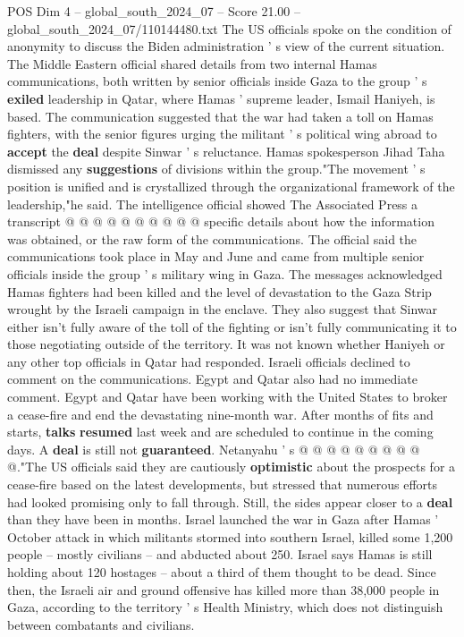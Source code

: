 \begin{textsample}{POS Dim 4 – global\_south\_2024\_07 – Score 21.00 – global\_south\_2024\_07/110144480.txt}
The US officials spoke on the condition of anonymity to discuss the Biden administration ' s view of the current situation.
The Middle Eastern official shared details from two internal Hamas communications, both written by senior officials inside Gaza to the group ' s \textbf{exiled} leadership in Qatar, where Hamas ' supreme leader, Ismail Haniyeh, is based.
The communication suggested that the war had taken a toll on Hamas fighters, with the senior figures urging the militant ' s political wing abroad to \textbf{accept} the \textbf{deal} despite Sinwar ' s reluctance.
Hamas spokesperson Jihad Taha dismissed any \textbf{suggestions} of divisions within the group."The movement ' s position is unified and is crystallized through the organizational framework of the leadership,"he said.
The intelligence official showed The Associated Press a transcript @ @ @ @ @ @ @ @ @ @ specific details about how the information was obtained, or the raw form of the communications.
The official said the communications took place in May and June and came from multiple senior officials inside the group ' s military wing in Gaza.
The messages acknowledged Hamas fighters had been killed and the level of devastation to the Gaza Strip wrought by the Israeli campaign in the enclave.
They also suggest that Sinwar either isn't fully aware of the toll of the fighting or isn't fully communicating it to those negotiating outside of the territory.
It was not known whether Haniyeh or any other top officials in Qatar had responded.
Israeli officials declined to comment on the communications.
Egypt and Qatar also had no immediate comment.
Egypt and Qatar have been working with the United States to broker a cease-fire and end the devastating nine-month war.
After months of fits and starts, \textbf{talks} \textbf{resumed} last week and are scheduled to continue in the coming days.
A \textbf{deal} is still not \textbf{guaranteed}.
Netanyahu ' s @ @ @ @ @ @ @ @ @ @."The US officials said they are cautiously \textbf{optimistic} about the prospects for a cease-fire based on the latest developments, but stressed that numerous efforts had looked promising only to fall through.
Still, the sides appear closer to a \textbf{deal} than they have been in months.
Israel launched the war in Gaza after Hamas ' October attack in which militants stormed into southern Israel, killed some 1,200 people -- mostly civilians -- and abducted about 250.
Israel says Hamas is still holding about 120 hostages -- about a third of them thought to be dead.
Since then, the Israeli air and ground offensive has killed more than 38,000 people in Gaza, according to the territory ' s Health Ministry, which does not distinguish between combatants and civilians.

\end{textsample}
